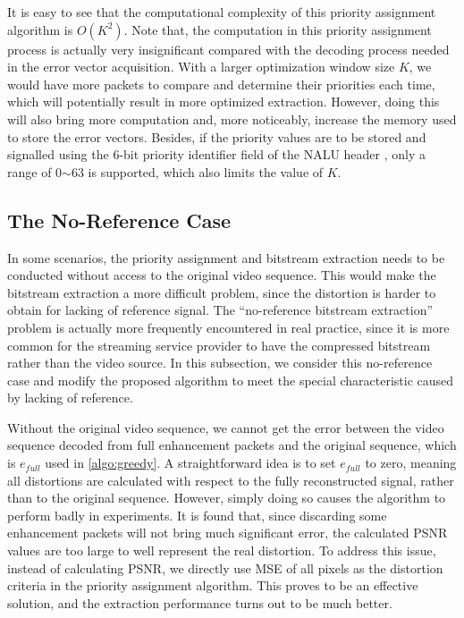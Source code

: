 \documentclass[journal]{IEEEtran}
\begin{document}
It is easy to see that the computational complexity of this priority assignment algorithm is $O(K^2)$. Note that, the computation in this priority assignment process is actually very insignificant compared with the decoding process needed in the error vector acquisition. With a larger optimization window size $K$, we would have more packets to compare and determine their priorities each time, which will potentially result in more optimized extraction. However, doing this will also bring more computation and, more noticeably, increase the memory used to store the error vectors. Besides, if the priority values are to be stored and signalled using the 6-bit priority identifier field of the NALU header \cite{Amonou07}, only a range of 0$\sim$63 is supported, which also limits the value of $K$.

\subsection{The No-Reference Case}
\label{subsec:noref-case}

In some scenarios, the priority assignment and bitstream extraction needs to be conducted without access to the original video sequence. This would make the bitstream extraction a more difficult problem, since the distortion is harder to obtain for lacking of reference signal. The ``no-reference bitstream extraction'' problem is actually more frequently encountered in real practice, since it is more common for the streaming service provider to have the compressed bitstream rather than the video source. In this subsection, we consider this no-reference case and modify the proposed algorithm to meet the special characteristic caused by lacking of reference.

Without the original video sequence, we cannot get the error between the video sequence decoded from full enhancement packets and the original sequence, which is $e_{full}$ used in \ref{algo:greedy}. A straightforward idea is to set $e_{full}$ to zero, meaning all distortions are calculated with respect to the fully reconstructed signal, rather than to the original sequence. However, simply doing so causes the algorithm to perform badly in experiments. It is found that, since discarding some enhancement packets will not bring much significant error, the calculated PSNR values are too large to well represent the real distortion. To address this issue, instead of calculating PSNR, we directly use MSE of all pixels as the distortion criteria in the priority assignment algorithm. This proves to be an effective solution, and the extraction performance turns out to be much better.
\end{document}
